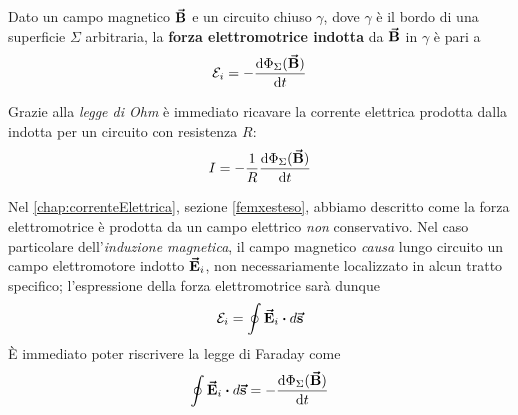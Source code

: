 \begin{theorema}
	Dato un campo magnetico $\vb*{\va{B}}$ e un circuito chiuso $\gamma$, dove $\gamma$ è il bordo di una superficie $\Sigma$ arbitraria, la \textbf{forza elettromotrice indotta} da $\vb*{\va{B}}$ in $\gamma$ è pari a
	\begin{equation}
		\mathcal{E}_i=-\dv{\Phi_\Sigma (\vb*{\va{B}})}{t}
	\end{equation}
\end{theorema}
Grazie alla \textit{legge di Ohm} è immediato ricavare la corrente elettrica prodotta dalla \fem indotta per un circuito con resistenza $R$:
\begin{equation}
	I=-\frac{1}{R}\dv{\Phi_\Sigma(\vb*{\va{B}})}{t}
\end{equation}

\begin{observe} %
	Nel \autoref{chap:correnteElettrica}, sezione \ref{femxesteso}, abbiamo descritto come la forza elettromotrice è prodotta da un campo elettrico \textit{non} conservativo. Nel caso particolare dell'\textit{induzione magnetica}, il campo magnetico \textit{causa} lungo circuito un campo elettromotore indotto $\vb*{\va{E}}_i$, non necessariamente localizzato in alcun tratto specifico; l'espressione della forza elettromotrice sarà dunque
	\begin{equation*}
		\mathcal{E}_i=\oint\vba{E}_i\vdot d\vba{s}
	\end{equation*}
	È immediato poter riscrivere la legge di Faraday come
	\begin{equation}
		\oint \vba E_i\vdot d\vba s =-\dv{\Phi_{\Sigma}(\vba B)}{t}		
	\end{equation}
\end{observe}
